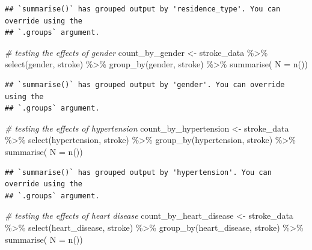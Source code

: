 \documentclass[
]{article}
\newenvironment{Shaded}{\begin{snugshade}}{\end{snugshade}}
\newcommand{\AttributeTok}[1]{\textcolor[rgb]{0.77,0.63,0.00}{#1}}
\newcommand{\CommentTok}[1]{\textcolor[rgb]{0.56,0.35,0.01}{\textit{#1}}}
\newcommand{\FunctionTok}[1]{\textcolor[rgb]{0.00,0.00,0.00}{#1}}
\newcommand{\NormalTok}[1]{#1}
\newcommand{\OtherTok}[1]{\textcolor[rgb]{0.56,0.35,0.01}{#1}}
\newcommand{\SpecialCharTok}[1]{\textcolor[rgb]{0.00,0.00,0.00}{#1}}
\renewcommand{\=}[1]{\stackrel{#1}{=}}
\theoremstyle{definition}
\theoremstyle{remark}
\begin{document}
\begin{verbatim}
## `summarise()` has grouped output by 'residence_type'. You can override using the
## `.groups` argument.
\end{verbatim}

\begin{Shaded}
\begin{Highlighting}[]
 \CommentTok{\# testing the effects of gender}
\NormalTok{count\_by\_gender }\OtherTok{\textless{}{-}}\NormalTok{ stroke\_data }\SpecialCharTok{\%\textgreater{}\%} 
   \FunctionTok{select}\NormalTok{(gender, stroke) }\SpecialCharTok{\%\textgreater{}\%} 
   \FunctionTok{group\_by}\NormalTok{(gender, stroke) }\SpecialCharTok{\%\textgreater{}\%}
   \FunctionTok{summarise}\NormalTok{( }\AttributeTok{N =} \FunctionTok{n}\NormalTok{())}
\end{Highlighting}
\end{Shaded}

\begin{verbatim}
## `summarise()` has grouped output by 'gender'. You can override using the
## `.groups` argument.
\end{verbatim}

\begin{Shaded}
\begin{Highlighting}[]
 \CommentTok{\# testing the effects of hypertension}
\NormalTok{count\_by\_hypertension }\OtherTok{\textless{}{-}}\NormalTok{ stroke\_data }\SpecialCharTok{\%\textgreater{}\%} 
   \FunctionTok{select}\NormalTok{(hypertension, stroke) }\SpecialCharTok{\%\textgreater{}\%} 
   \FunctionTok{group\_by}\NormalTok{(hypertension, stroke) }\SpecialCharTok{\%\textgreater{}\%}
   \FunctionTok{summarise}\NormalTok{( }\AttributeTok{N =} \FunctionTok{n}\NormalTok{())}
\end{Highlighting}
\end{Shaded}

\begin{verbatim}
## `summarise()` has grouped output by 'hypertension'. You can override using the
## `.groups` argument.
\end{verbatim}

\begin{Shaded}
\begin{Highlighting}[]
\CommentTok{\# testing the effects of heart disease}
\NormalTok{count\_by\_heart\_disease }\OtherTok{\textless{}{-}}\NormalTok{ stroke\_data }\SpecialCharTok{\%\textgreater{}\%} 
   \FunctionTok{select}\NormalTok{(heart\_disease, stroke) }\SpecialCharTok{\%\textgreater{}\%} 
   \FunctionTok{group\_by}\NormalTok{(heart\_disease, stroke) }\SpecialCharTok{\%\textgreater{}\%}
   \FunctionTok{summarise}\NormalTok{( }\AttributeTok{N =} \FunctionTok{n}\NormalTok{())}
\end{Highlighting}
\end{Shaded}
\end{document}
